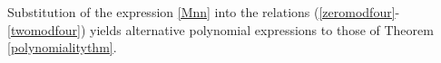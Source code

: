 Substitution of the expression \eqref{Mnn} into the relations (\ref{zeromodfour}-\ref{twomodfour}) yields alternative polynomial expressions to those of Theorem \ref{polynomialitythm}.

